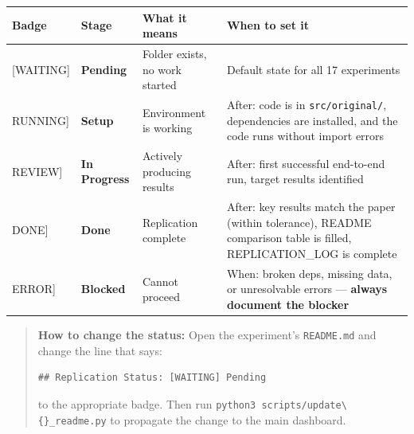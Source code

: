 {\def\LTcaptype{none} %
\small
\begin{longtable}[]{@{}
  >{\raggedright\arraybackslash}p{}
  >{\raggedright\arraybackslash}p{}
  >{\raggedright\arraybackslash}p{}
  >{\raggedright\arraybackslash}p{}@{}}
\toprule\noalign{}
\begin{minipage}[b]{\linewidth}\raggedright
Badge
\end{minipage} & \begin{minipage}[b]{\linewidth}\raggedright
Stage
\end{minipage} & \begin{minipage}[b]{\linewidth}\raggedright
What it means
\end{minipage} & \begin{minipage}[b]{\linewidth}\raggedright
When to set it
\end{minipage} \\
\midrule\noalign{}
\endhead
\bottomrule\noalign{}
\endlastfoot
{[}WAITING{]} & \textbf{Pending} & Folder exists, no work started &
Default state for all 17 experiments \\
{[}RUNNING{]} & \textbf{Setup} & Environment is working & After: code is
in \texttt{src/original/}, dependencies are installed,
and the code runs without import errors \\
{[}REVIEW{]} & \textbf{In Progress} & Actively producing results &
After: first successful end-to-end run, target results identified \\
{[}DONE{]} & \textbf{Done} & Replication complete & After: key results
match the paper (within tolerance), README comparison table is filled,
REPLICATION\_LOG is complete \\
{[}ERROR{]} & \textbf{Blocked} & Cannot proceed & When: broken deps,
missing data, or unresolvable errors --- \textbf{always document the
blocker} \\
\end{longtable}
}

\begin{quote}
\small \textbf{How to change the status:} Open the experiment's
\texttt{README.md} and change the line that says:

\begin{verbatim}
## Replication Status: [WAITING] Pending
\end{verbatim}

to the appropriate badge. Then run
\texttt{python3 scripts/update\textbackslash\{\}\_readme.py} to propagate
the change to the main dashboard.
\end{quote}
